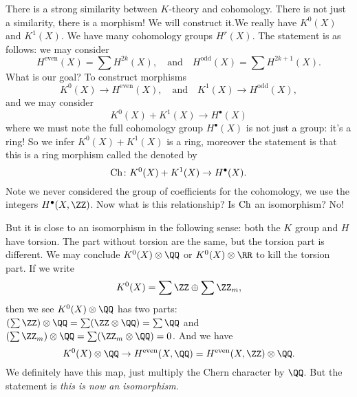 There is a strong similarity between $K$-theory and
cohomology. There is not just a similarity, there is a morphism!
We will construct it.We really have $K^0(X)$ and $K^1(X)$. We
have many cohomology groups $H^{r}(X)$. The statement is as
follows: we may consider
\begin{equation}
H^{\text{even}}(X)=\sum H^{2k}(X),\quad\mbox{and}\quad
H^{\text{odd}}(X)=\sum H^{2k+1}(X).
\end{equation}
What is our goal? To construct morphisms
\begin{equation}
K^{0}(X)\to H^{\text{even}}(X),\quad\mbox{and}\quad
K^{1}(X)\to H^{\text{odd}}(X),
\end{equation}
and we may consider
\begin{equation}
K^0(X)+K^1(X)\to H^{\bullet}(X)
\end{equation}
where we must note the full cohomology group $H^{\bullet}(X)$ is
not just a group: it's a ring! So we infer $K^0(X)+K^1(X)$ is a
ring, moreover the statement is that this is a ring morphism
called the  denoted by
\begin{equation}
\mathop{\mathrm{Ch}}\nolimits\colon K^{0}(X)+K^{1}(X)\to H^{\bullet}(X).
\end{equation}
Note we never considered the group of coefficients for the
cohomology, we use the integers $H^{\bullet}(X,\ZZ)$. Now what is
this relationship? Is $\mathop{\mathrm{Ch}}\nolimits$ an isomorphism? No!

But it is close to an isomorphism in the following sense: both
the $K$ group and $H$ have torsion. The part without torsion are
the same, but the torsion part is different. We may conclude
$K^{0}(X)\otimes\QQ$ or $K^{0}(X)\otimes\RR$ to kill the torsion
part. If we write 
\begin{equation}
K^{0}(X)=\sum\ZZ\oplus\sum\ZZ_{m}, 
\end{equation}
then we see $K^{0}(X)\otimes\QQ$ has two parts:
$(\sum\ZZ)\otimes\QQ=\sum(\ZZ\otimes\QQ)=\sum\QQ$ and
$(\sum\ZZ_{m})\otimes\QQ=\sum(\ZZ_{m}\otimes\QQ)=0$. And we have
\begin{equation}
K^{0}(X)\otimes\QQ\to H^{\text{even}}(X,\QQ)=H^{\text{even}}(X,\ZZ)\otimes\QQ.
\end{equation}
We definitely have this map, just multiply the Chern
character by $\QQ$. But the statement is \emph{this is now an isomorphism}.
